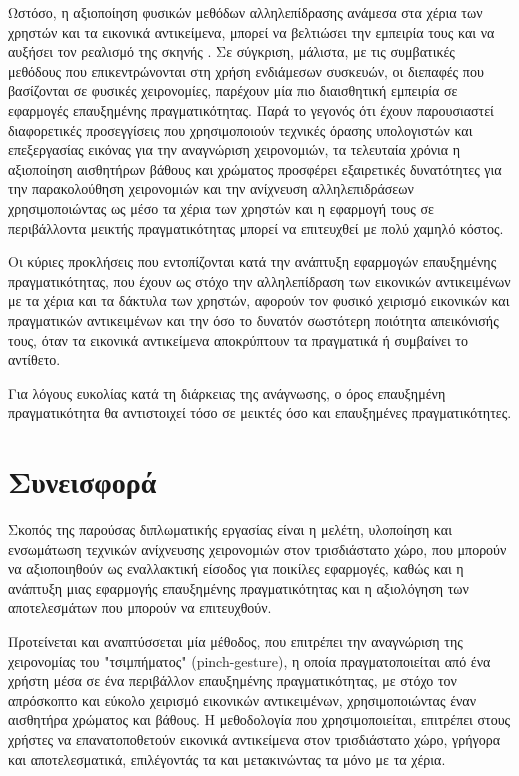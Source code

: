 Ωστόσο, η αξιοποίηση φυσικών μεθόδων αλληλεπίδρασης ανάμεσα στα χέρια των χρηστών και τα εικονικά αντικείμενα, μπορεί να βελτιώσει την εμπειρία τους και να αυξήσει τον ρεαλισμό της σκηνής \cite{Kato2000}.  Σε σύγκριση, μάλιστα, με τις συμβατικές μεθόδους που επικεντρώνονται στη χρήση ενδιάμεσων συσκευών, οι διεπαφές που βασίζονται σε φυσικές χειρονομίες, παρέχουν μία πιο διαισθητική εμπειρία σε εφαρμογές επαυξημένης πραγματικότητας. Παρά το γεγονός ότι έχουν παρουσιαστεί διαφορετικές προσεγγίσεις που χρησιμοποιούν τεχνικές όρασης υπολογιστών και επεξεργασίας εικόνας για την αναγνώριση χειρονομιών, τα τελευταία χρόνια η αξιοποίηση αισθητήρων βάθους και χρώματος προσφέρει εξαιρετικές δυνατότητες για την παρακολούθηση χειρονομιών και την ανίχνευση αλληλεπιδράσεων χρησιμοποιώντας ως μέσο τα χέρια των χρηστών και η εφαρμογή τους σε περιβάλλοντα μεικτής πραγματικότητας μπορεί να επιτευχθεί με πολύ χαμηλό κόστος.


Οι κύριες προκλήσεις που εντοπίζονται κατά την ανάπτυξη εφαρμογών επαυξημένης πραγματικότητας, που έχουν ως στόχο την αλληλεπίδραση των εικονικών αντικειμένων με τα χέρια και τα δάκτυλα των χρηστών, αφορούν τον φυσικό χειρισμό εικονικών και πραγματικών αντικειμένων και την όσο το δυνατόν σωστότερη ποιότητα απεικόνισής τους, όταν τα εικονικά αντικείμενα αποκρύπτουν τα πραγματικά ή συμβαίνει το αντίθετο. 


Για λόγους ευκολίας κατά τη διάρκειας της ανάγνωσης, ο όρος επαυξημένη πραγματικότητα θα αντιστοιχεί τόσο σε μεικτές όσο και επαυξημένες πραγματικότητες.



\section{Συνεισφορά}



Σκοπός της παρούσας διπλωματικής εργασίας είναι η μελέτη, υλοποίηση και ενσωμάτωση τεχνικών ανίχνευσης χειρονομιών στον τρισδιάστατο χώρο, που μπορούν να αξιοποιηθούν ως εναλλακτική είσοδος για ποικίλες εφαρμογές, καθώς και η ανάπτυξη μιας εφαρμογής επαυξημένης πραγματικότητας και η αξιολόγηση των αποτελεσμάτων που μπορούν να επιτευχθούν. 



Προτείνεται και αναπτύσσεται μία μέθοδος, που επιτρέπει την αναγνώριση της χειρονομίας του "τσιμπήματος" (pinch-gesture), η οποία πραγματοποιείται από ένα χρήστη μέσα σε ένα περιβάλλον επαυξημένης πραγματικότητας, με στόχο τον απρόσκοπτο και εύκολο χειρισμό εικονικών αντικειμένων, χρησιμοποιώντας έναν αισθητήρα χρώματος και βάθους. Η μεθοδολογία που χρησιμοποιείται, επιτρέπει στους χρήστες να επανατοποθετούν εικονικά αντικείμενα στον τρισδιάστατο χώρο, γρήγορα και αποτελεσματικά, επιλέγοντάς τα και μετακινώντας τα μόνο με τα χέρια.


